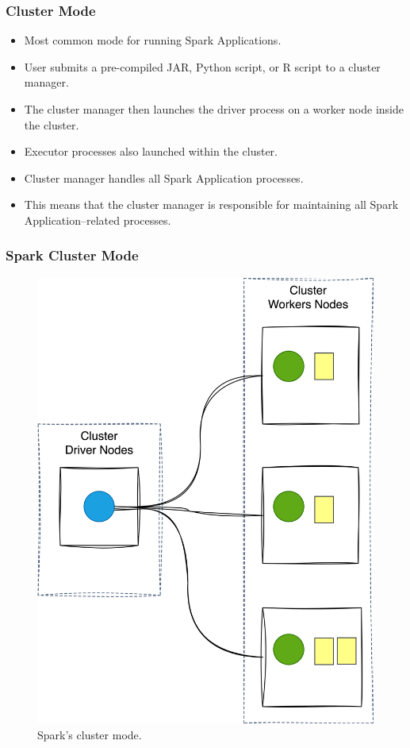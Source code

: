 \begin{frame}
    \frametitle{Cluster Mode}
    \begin{itemize}
        \item Most common mode for running Spark Applications.
        \item User submits a pre-compiled JAR, Python script, or R script to a cluster manager.
        \item The cluster manager then launches the driver process on a worker node inside the cluster.
        \item Executor processes also launched within the cluster.
        \item Cluster manager handles all Spark Application processes.
        \item This means that the cluster manager is responsible for maintaining all Spark Application–related processes.
    \end{itemize}
\end{frame}

\begin{frame}
    \frametitle{Spark Cluster Mode}
    \begin{figure}
        \includegraphics[width=\textwidth,height=.7\textheight,keepaspectratio]{./Figures/chapter-04/spark_cluster_mode}
        \caption{Spark’s cluster mode.}\label{fig:cluster_mode}
    \end{figure}
\end{frame}

